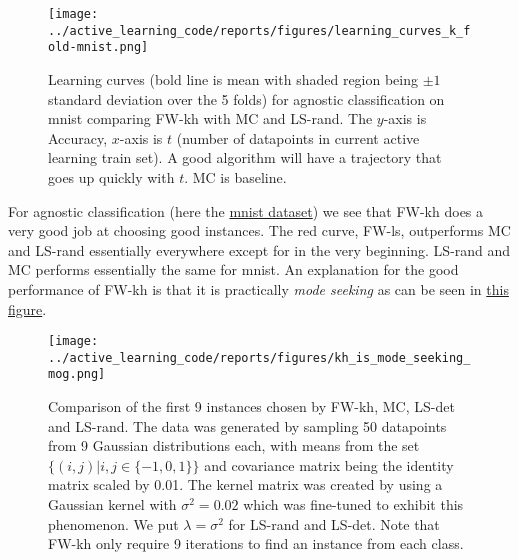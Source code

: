 \begin{figure}[ht] \centering
  \label{fig:learning-curve-mnist-agnostic-experiments}
  \texttt{[image: ../active\_learning\_code/reports/figures/learning\_curves\_k\_fold-mnist.png]}
  \caption{Learning curves (bold line is mean with shaded region being \(\pm 1\)
    standard deviation over the 5 folds) for agnostic classification on mnist
    comparing FW-kh with MC and LS-rand. The \(y\)-axis is Accuracy, \(x\)-axis
    is \(t\) (number of datapoints in current active learning train set). A good
    algorithm will have a trajectory that goes up quickly with \(t\). MC is
    baseline.}
\end{figure}

For agnostic classification (here the
\hyperref[fig:learning-curve-mnist-agnostic-experiments]{mnist dataset}) we see
that FW-kh does a very good job at choosing good instances. The red curve, FW-ls,
outperforms MC and LS-rand essentially everywhere except for in the very
beginning. LS-rand and MC performs essentially the same for mnist. An explanation for the good performance of
FW-kh is that it is practically \textit{mode seeking} as can be seen in
\hyperref[fig:kh-is-mode-seeking]{this figure}.

\begin{figure}[ht]
  \centering
  \label{fig:kh-is-mode-seeking}
  \texttt{[image: ../active\_learning\_code/reports/figures/kh\_is\_mode\_seeking\_mog.png]}
  \caption{Comparison of the first 9 instances chosen by FW-kh, MC, LS-det and
    LS-rand. The data was generated by sampling 50 datapoints from 9 Gaussian
    distributions each, with means from the set \(\{(i, j)| i, j \in \{-1, 0, 1\}\}\)  and covariance matrix being the
    identity matrix scaled by 0.01. The kernel matrix was created by using a
    Gaussian kernel with \(\sigma^{2} = 0.02\) which was fine-tuned to exhibit
    this phenomenon. We put \(\lambda = \sigma^2\) for LS-rand and LS-det. Note
    that FW-kh only require 9 iterations to find an instance from each class.}
\end{figure}